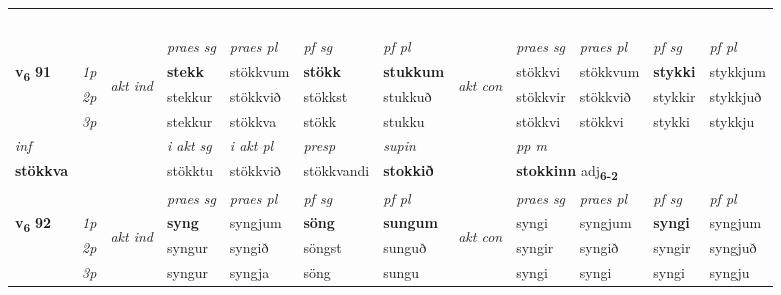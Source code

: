 \begin{longtable}[l]{X>{\footnotesize\itshape}llXXXXlXXXX}
\midrule
  & \\*
   & \\*
     & \\*
   & \\*
  & \\
   \midrule
 & &   & \textit{praes sg}  & \textit{praes pl}    & \textit{ pf sg} & \textit{pf pl} & & \textit{praes sg}  & \textit{praes pl}    & \textit{pf sg} & \textit{pf pl }  \\ \cmidrule{4-7} \cmidrule{9-12}
 \multirow{2}{*}{{{\textbf{v{\textsubscript{6}}} \Large{\textbf{91}}}}}  & 1p & \multirow{3}{*}{\begin{turn}{90}\textit{akt ind}\end{turn}} & \textbf{stekk} & stökkvum & \textbf{stökk} & \textbf{stukkum} & \multirow{3}{*}{\begin{turn}{90}\textit{akt con}\end{turn}} &stökkvi & stökkvum & \textbf{stykki} & stykkjum\\*
 & 2p &  &  stekkur  & stökkvið & stökkst & stukkuð & & stökkvir & stökkvið & stykkir & stykkjuð \\*
 & 3p &  & stekkur & stökkva & stökk & stukku & & stökkvi & stökkvi& stykki & stykkju \\*
\cmidrule{4-7} \cmidrule{9-12}

   {\textit{inf}} & &  & \textit{i akt sg} & \textit{i akt pl}   & \textit{presp} & \textit{supin}  && \textit{pp m} \\*
  {\textbf{stökkva}} & && stökktu  & stökkvið   & stökkvandi &  \textbf{stokkið}  && \multicolumn{2}{l}{\textbf{stokkinn} adj\textbf{\textsubscript{6-2}}} \\*

\midrule

 & &   & \textit{praes sg}  & \textit{praes pl}    & \textit{ pf sg} & \textit{pf pl} & & \textit{praes sg}  & \textit{praes pl}    & \textit{pf sg} & \textit{pf pl }  \\ \cmidrule{4-7} \cmidrule{9-12}
 \multirow{2}{*}{{{\textbf{v{\textsubscript{6}}} \Large{\textbf{92}}}}}  & 1p & \multirow{3}{*}{\begin{turn}{90}\textit{akt ind}\end{turn}} & \textbf{syng} & syngjum & \textbf{söng} & \textbf{sungum} & \multirow{3}{*}{\begin{turn}{90}\textit{akt con}\end{turn}} &syngi & syngjum & \textbf{syngi} & syngjum\\*
 & 2p &  &  syngur  & syngið & söngst & sunguð & & syngir & syngið & syngir & syngjuð \\*
 & 3p &  & syngur & syngja & söng & sungu & & syngi & syngi& syngi & syngju \\*
\cmidrule{4-7} \cmidrule{9-12}


\end{longtable}

